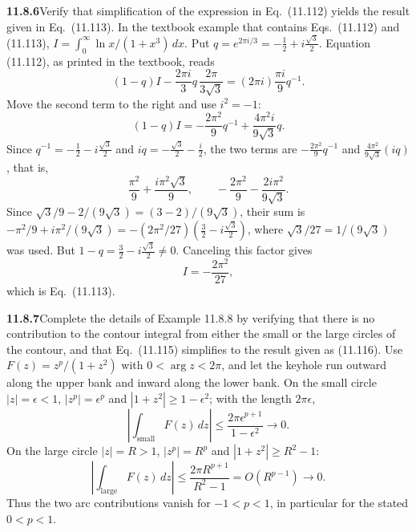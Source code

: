 \par\bigskip
\noindent\textbf{11.8.6}\quad Verify that simplification of the expression in
Eq.~(11.112) yields the result given in Eq.~(11.113).
\solution
In the textbook example that contains Eqs.~(11.112) and (11.113),
$I=\int_0^\infty\ln x/(1+x^3)\,dx$. Put
$q=e^{2\pi i/3}=-\tfrac12+i\tfrac{\sqrt3}{2}$.
Equation (11.112), as printed in the textbook, reads
\[
(1-q)I-\frac{2\pi i}{3}q\,\frac{2\pi}{3\sqrt3}
=(2\pi i)\frac{\pi i}{9}q^{-1}.
\]
Move the second term to the right and use $i^2=-1$:
\[
(1-q)I=-\frac{2\pi^2}{9}q^{-1}
+\frac{4\pi^2i}{9\sqrt3}q.
\]
Since $q^{-1}=-\tfrac12-i\tfrac{\sqrt3}{2}$ and
$iq=-\tfrac{\sqrt3}{2}-\tfrac i2$, the two terms are
$-\frac{2\pi^2}{9}q^{-1}$ and
$\frac{4\pi^2}{9\sqrt3}(iq)$, that is,
\[
\frac{\pi^2}{9}+\frac{i\pi^2\sqrt3}{9},
\qquad
-\frac{2\pi^2}{9}-\frac{2i\pi^2}{9\sqrt3}.
\]
Since $\sqrt3/9-2/(9\sqrt3)=(3-2)/(9\sqrt3)$, their sum is
$-\pi^2/9+i\pi^2/(9\sqrt3)
=-(2\pi^2/27)(\tfrac32-i\tfrac{\sqrt3}{2})$, where
$\sqrt3/27=1/(9\sqrt3)$ was used.
But $1-q=\tfrac32-i\tfrac{\sqrt3}{2}\ne0$. Canceling this factor gives
\[
\boxed{I=-\frac{2\pi^2}{27}},
\]
which is Eq.~(11.113).

\par\bigskip
\noindent\textbf{11.8.7}\quad Complete the details of Example 11.8.8 by
verifying that there is no contribution to the contour integral from either
the small or the large circles of the contour, and that Eq.~(11.115)
simplifies to the result given as (11.116).
\solution
Use $F(z)=z^p/(1+z^2)$ with $0<\arg z<2\pi$, and let the keyhole
run outward along the upper bank and inward along the lower bank.
On the small circle $|z|=\epsilon<1$, $|z^p|=\epsilon^p$ and
$|1+z^2|\ge1-\epsilon^2$; with the length $2\pi\epsilon$,
\[
\left|\int_{\text{small}}F(z)\,dz\right|
\le\frac{2\pi\epsilon^{p+1}}{1-\epsilon^2}\longrightarrow0.
\]
On the large circle $|z|=R>1$, $|z^p|=R^p$ and $|1+z^2|\ge R^2-1$:
\[
\left|\int_{\text{large}}F(z)\,dz\right|
\le\frac{2\pi R^{p+1}}{R^2-1}
=O(R^{p-1})\longrightarrow0.
\]
Thus the two arc contributions vanish for $-1<p<1$, in particular
for the stated $0<p<1$.


